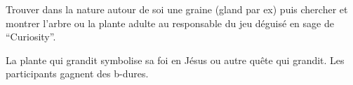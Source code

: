 \documentclass{grand-jeu}
\begin{document}
\begin{regles}
Trouver dans la nature autour de soi une graine (gland par ex) puis chercher et montrer l’arbre ou la plante adulte au responsable du jeu déguisé en sage de “Curiosity”.

La plante qui grandit symbolise sa foi en Jésus ou autre quête qui grandit. Les participants gagnent des b-dures. 

\end{regles}

\begin{imaginaire}

\end{imaginaire}

\begin{moments-stop}
\end{moments-stop}
\end{document}
